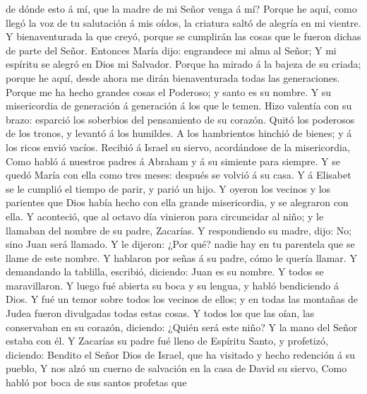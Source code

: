 de dónde esto á mí, que la madre de mi Señor venga á mí? 
Porque he aquí, como llegó la voz de tu salutación á mis oídos, la
criatura saltó de alegría en mi vientre.  Y
bienaventurada la que creyó, porque se cumplirán las cosas que le fueron
dichas de parte del Señor.  Entonces María dijo:
engrandece mi alma al Señor;  Y mi espíritu se alegró en
Dios mi Salvador.  Porque ha mirado á la bajeza de su
criada; porque he aquí, desde ahora me dirán bienaventurada todas las
generaciones.  Porque me ha hecho grandes cosas el
Poderoso; y santo es su nombre.  Y su misericordia de
generación á generación á los que le temen.  Hizo
valentía con su brazo: esparció los soberbios del pensamiento de su
corazón.  Quitó los poderosos de los tronos, y levantó á
los humildes.  A los hambrientos hinchió de bienes; y á
los ricos envió vacíos.  Recibió á Israel su siervo,
acordándose de la misericordia,  Como habló á nuestros
padres á Abraham y á su simiente para siempre.  Y se
quedó María con ella como tres meses: después se volvió á su casa.
 Y á Elisabet se le cumplió el tiempo de parir, y parió
un hijo.  Y oyeron los vecinos y los parientes que Dios
había hecho con ella grande misericordia, y se alegraron con ella.
 Y aconteció, que al octavo día vinieron para circuncidar
al niño; y le llamaban del nombre de su padre, Zacarías. 
Y respondiendo su madre, dijo: No; sino Juan será llamado.
 Y le dijeron: ¿Por qué? nadie hay en tu parentela que se
llame de este nombre.  Y hablaron por señas á su padre,
cómo le quería llamar.  Y demandando la tablilla,
escribió, diciendo: Juan es su nombre. Y todos se maravillaron.
 Y luego fué abierta su boca y su lengua, y habló
bendiciendo á Dios.  Y fué un temor sobre todos los
vecinos de ellos; y en todas las montañas de Judea fueron divulgadas
todas estas cosas.  Y todos los que las oían, las
conservaban en su corazón, diciendo: ¿Quién será este niño? Y la mano
del Señor estaba con él.  Y Zacarías su padre fué lleno
de Espíritu Santo, y profetizó, diciendo:  Bendito el
Señor Dios de Israel, que ha visitado y hecho redención á su pueblo,
 Y nos alzó un cuerno de salvación en la casa de David su
siervo,  Como habló por boca de sus santos profetas que
